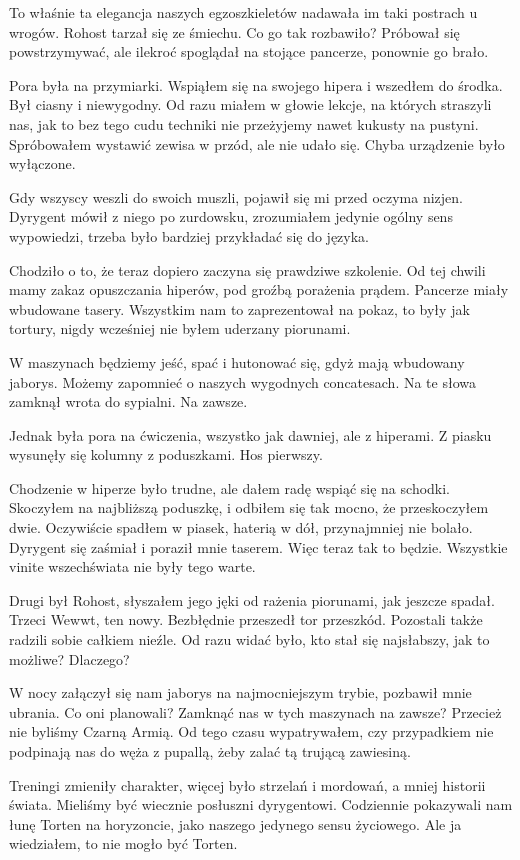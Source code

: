 To właśnie ta elegancja naszych egzoszkieletów nadawała im taki postrach u wrogów.
Rohost tarzał się ze śmiechu. Co go tak rozbawiło?
Próbował się powstrzymywać, ale ilekroć spoglądał na stojące pancerze, ponownie go brało.

Pora była na przymiarki.
Wspiąłem się na swojego hipera i wszedłem do środka.
Był ciasny i niewygodny.
Od razu miałem w głowie lekcje, na których straszyli nas, jak to bez tego cudu techniki nie przeżyjemy nawet kukusty na pustyni.
Spróbowałem wystawić zewisa w przód, ale nie udało się.
Chyba urządzenie było wyłączone.

Gdy wszyscy weszli do swoich muszli, pojawił się mi przed oczyma nizjen.
Dyrygent mówił z niego po zurdowsku, zrozumiałem jedynie ogólny sens wypowiedzi, trzeba było bardziej przykładać się do języka.

Chodziło o to, że teraz dopiero zaczyna się prawdziwe szkolenie.
Od tej chwili mamy zakaz opuszczania hiperów, pod groźbą porażenia prądem.
Pancerze miały wbudowane tasery.
Wszystkim nam to zaprezentował na pokaz, to były jak tortury, nigdy wcześniej nie byłem uderzany piorunami.

W maszynach będziemy jeść, spać i hutonować się, gdyż mają wbudowany jaborys.
Możemy zapomnieć o naszych wygodnych concatesach.
Na te słowa zamknął wrota do sypialni. Na zawsze.

Jednak była pora na ćwiczenia, wszystko jak dawniej, ale z hiperami.
Z piasku wysunęły się kolumny z poduszkami.
Hos pierwszy.

Chodzenie w hiperze było trudne, ale dałem radę wspiąć się na schodki.
Skoczyłem na najbliższą poduszkę, i odbiłem się tak mocno, że przeskoczyłem dwie.
Oczywiście spadłem w piasek, haterią w dół, przynajmniej nie bolało.
Dyrygent się zaśmiał i poraził mnie taserem. Więc teraz tak to będzie.
Wszystkie vinite wszechświata nie były tego warte.

Drugi był Rohost, słyszałem jego jęki od rażenia piorunami, jak jeszcze spadał.
Trzeci Wewwt, ten nowy.
Bezbłędnie przeszedł tor przeszkód.
Pozostali także radzili sobie całkiem nieźle.
Od razu widać było, kto stał się najsłabszy, jak to możliwe?
Dlaczego?

W nocy załączył się nam jaborys na najmocniejszym trybie, pozbawił mnie ubrania.
Co oni planowali? Zamknąć nas w tych maszynach na zawsze? Przecież nie byliśmy Czarną Armią.
Od tego czasu wypatrywałem, czy przypadkiem nie podpinają nas do węża z pupallą, żeby zalać tą trującą zawiesiną.

Treningi zmieniły charakter, więcej było strzelań i mordowań, a mniej historii świata.
Mieliśmy być wiecznie posłuszni dyrygentowi. Codziennie pokazywali nam łunę Torten na horyzoncie, jako naszego jedynego sensu życiowego.
Ale ja wiedziałem, to nie mogło być Torten.

